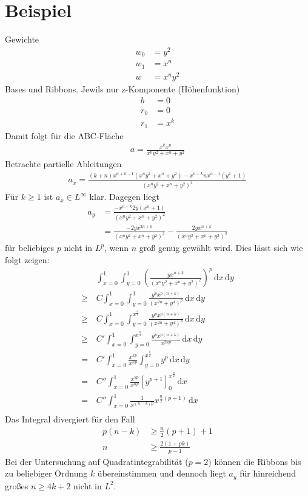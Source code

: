 \documentclass[10pt,a4paper]{report}
\author{Ludwig Paul Lind}
\begin{document}
\chapter{Beispiel}
Gewichte
\begin{align*}
w_0 &= y^2 \\
w_1 &= x^n \\
w &= x^n y^2
\end{align*}
Bases und Ribbons. Jewils nur z-Komponente (Höhenfunktion)
\begin{align*}
b &= 0 \\
r_0 &= 0 \\
r_1 &= x^k
\end{align*}
Damit folgt für die ABC-Fläche
\begin{align*}
a = \frac{x^k x^n}{x^n y^2 + x^n + y^2}
\end{align*}
Betrachte partielle Ableitungen
\begin{align*}
a_x = \frac{\left(k+n\right) x^{n+k-1} \left( x^ny^2+x^n+y^2\right) - x^{n+k} n x^{n-1} \left(y^2 + 1\right)}{\left(x^ny^2+x^n+y^2\right)^2}
\end{align*}
Für $k \geq 1$ ist $a_x \in L^{\infty}$ klar.
Dagegen liegt 
\begin{align*}
a_y &= \frac{-x^{n+k} 2 y \left(x^n + 1\right)}{\left(x^ny^2+x^n+y^2\right)^2} \\
&=  \frac{-2yx^{2n+k}}{\left(x^ny^2+x^n+y^2\right)^2} - \frac{2yx^{n+k}}{\left(x^ny^2+x^n+y^2\right)^2}
\end{align*}
für beliebiges $p$ nicht in $L^p$, wenn $n$ groß genug gewählt wird.
Dies lässt sich wie folgt zeigen:
\begin{align*}
&\int_{x=0}^{1} \int_{y=0}^{1} \left( \frac{yx^{n+k}}{\left(x^ny^2+x^n+y^2\right)^2} \right)^p \, \mathrm{d}x \, \mathrm{d}y \\
\geq \, &C \int_{x=0}^{1} \int_{y=0}^{1}  \frac{y^px^{p\left(n+k\right)}}{\left(x^{2n}+y^4\right)^p}  \, \mathrm{d}x \, \mathrm{d}y \\
\geq \, &C \int_{x=0}^{1} \int_{y=0}^{x^{\frac{n}{2}}}  \frac{y^px^{p\left(n+k\right)}}{\left(x^{2n}+y^4\right)^p}  \, \mathrm{d}x \, \mathrm{d}y \\
\geq \, &C' \int_{x=0}^{1} \int_{y=0}^{x^{\frac{n}{2}}}  \frac{y^px^{p\left(n+k\right)}}{x^{2np}}  \, \mathrm{d}x \, \mathrm{d}y \\
= \, &C' \int_{x=0}^{1} \frac{x^{kp}}{x^{np}} \int_{y=0}^{x^{\frac{n}{2}}} y^p  \, \mathrm{d}x \, \mathrm{d}y \\
= \, &C'' \int_{x=0}^{1} \frac{x^{kp}}{x^{np}} \left[y^{p+1}\right]_{0}^{x^{\frac{n}{2}}} \, \mathrm{d}x\\
= \, &C'' \int_{x=0}^{1} \frac{1}{x^{\left(n-k\right)p}} x^{\frac{n}{2}\left(p+1\right)} \, \mathrm{d}x\\
\end{align*}
Das Integral divergiert für den Fall
\begin{align*}
p \left(n - k\right) &\geq \frac{n}{2}\left(p+1\right) + 1 \\
n &\geq \frac{2 \left(1+pk\right)}{p-1}
\end{align*}
Bei der Untersuchung auf Quadratintegrabilität ($p=2$) können die Ribbons bis zu beliebiger Ordnung $k$ übereinstimmen und dennoch liegt $a_y$ für hinreichend großes $n \geq 4k+2$ nicht in $L^2$.
\end{document}
